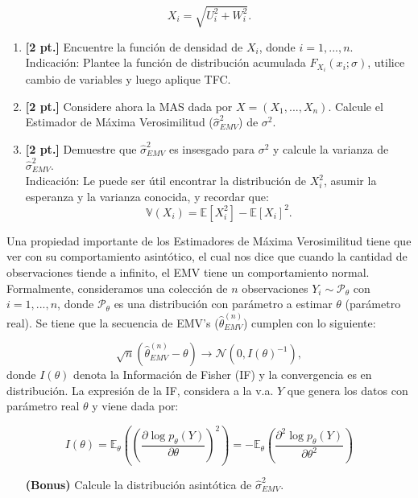 \documentclass[letterpaper,11pt]{article}
\theoremstyle{plain}
\theoremstyle{definition}
\newcommand{\1}{\mathbbm{1}}
\newcommand{\Et}[1]{\mathbb{E}_\theta \left(#1\right)}
\begin{document}
\[X_i = \sqrt{U_i^2 + W_i^2}.\]

\begin{enumerate}[label=\alph*)]
    \item \textbf{[2 pt.]} Encuentre la función de densidad de $X_i$, donde $i=1,...,n$.\\
    Indicación: Plantee la función de distribución acumulada $F_{X_i}(x_i;\sigma)$, utilice cambio de variables y luego aplique TFC.

    \item \textbf{[2 pt.]} Considere ahora la MAS dada por $X=(X_1,...,X_n)$. Calcule el Estimador de Máxima Verosimilitud ($\hat{\sigma}^2_{EMV}$) de $\sigma^2$.
    \item \textbf{[2 pt.]} Demuestre que $\hat{\sigma}^2_{EMV}$ es insesgado para $\sigma^2$ y calcule la varianza de $\hat{\sigma}^2_{EMV}$.\\
    Indicación: Le puede ser útil encontrar la distribución de $X_i^2$, asumir la esperanza y la varianza conocida, y recordar que:
    \[\mathbb{V}(X_i) = \mathbb{E}[X_i^2] - \mathbb{E}[X_i]^2.  \]

\end{enumerate} 

Una propiedad importante de los Estimadores de Máxima Verosimilitud tiene que ver con su comportamiento asintótico, el cual nos dice que cuando la cantidad de observaciones tiende a infinito, el EMV tiene un comportamiento normal. Formalmente, consideramos una colección de $n$ observaciones $Y_i\sim\mathcal{P}_\theta$ con $i=1,...,n$, donde $\mathcal{P}_\theta$ es una distribución con parámetro a estimar $\theta$ (parámetro real). Se tiene que la secuencia de EMV's ($\hat{\theta}_{EMV}^{(n)}$) cumplen con lo siguiente:

\[\sqrt{n}(\hat{\theta}_{EMV}^{(n)}-\theta) \rightarrow \mathcal{N}(0, I(\theta)^{-1}),  \]
donde $I(\theta)$ denota la Información de Fisher (IF) y la convergencia es en distribución. La expresión de la IF, considera a la v.a. $Y$ que genera los datos con parámetro real $\theta$ y viene dada por:

\begin{equation}
I(\theta) = \Et{\left(\frac{\partial \log   p_\theta(Y)}{\partial\theta}\right)^2} = 	-\Et{\frac{\partial^2 \log   p_\theta(Y)}{\partial\theta^2}}
\end{equation}


\begin{enumerate}
    
    \item [\textbf{(Bonus)}] Calcule la distribución asintótica de $\hat{\sigma}^2_{EMV}$.

\end{enumerate}
\end{document}
